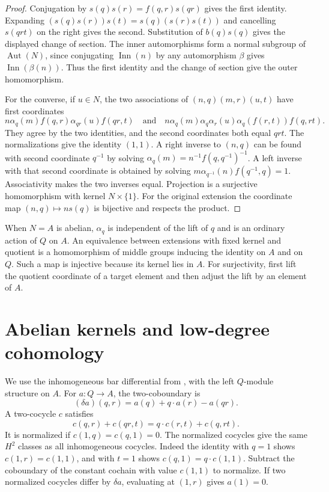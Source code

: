 \documentclass[11pt,oneside,openany]{book}
\theoremstyle{definition}
\theoremstyle{remark}
\begin{document}
\begin{proof}
Conjugation by \(s(q)s(r)=f(q,r)s(qr)\) gives the first identity.
Expanding \((s(q)s(r))s(t)=s(q)(s(r)s(t))\) and cancelling \(s(qrt)\)
on the right gives the second. Substitution of \(b(q)s(q)\) gives
the displayed change of section. The inner automorphisms form a
normal subgroup of \(\operatorname{Aut}(N)\), since conjugating
\(\operatorname{Inn}(n)\) by any automorphism \(\beta\) gives
\(\operatorname{Inn}(\beta(n))\). Thus the first identity and the
change of section give the outer homomorphism.

For the converse, if \(u\in N\), the two associations of
\((n,q)(m,r)(u,t)\) have first coordinates
\[
 n\alpha_q(m) f(q,r)\alpha_{qr}(u) f(qr,t)
 \quad\text{and}\quad
 n\alpha_q(m)\alpha_q\alpha_r(u)\alpha_q(f(r,t))f(q,rt).
\]
They agree by the two identities, and the second coordinates both
equal \(qrt\). The normalizations give the identity \((1,1)\).
A right inverse to \((n,q)\) can be found with second coordinate
\(q^{-1}\) by solving \(\alpha_q(m)=n^{-1}f(q,q^{-1})^{-1}\).
A left inverse with that second coordinate is obtained by solving
\(m\alpha_{q^{-1}}(n)f(q^{-1},q)=1\).
Associativity makes the two inverses equal. Projection is a
surjective homomorphism with kernel \(N\times\{1\}\).
For the original extension the coordinate map
\((n,q)\mapsto ns(q)\) is bijective and respects the product.
\end{proof}

When \(N=A\) is abelian, \(\alpha_q\) is independent of the lift of
\(q\) and is an ordinary action of \(Q\) on \(A\). An equivalence
between extensions with fixed kernel and quotient is a homomorphism
of middle groups inducing the identity on \(A\) and on \(Q\).
Such a map is injective because its kernel lies in \(A\). For
surjectivity, first lift the quotient coordinate of a target
element and then adjust the lift by an element of \(A\).

\section{Abelian kernels and low-degree cohomology}

We use the inhomogeneous bar differential from
\cite[A02 and A03]{homalg}, with the left \(Q\)-module structure on
\(A\). For \(a:Q\to A\), the two-coboundary is
\[
 (\delta a)(q,r)=a(q)+q\cdot a(r)-a(qr).
\]
A two-cocycle \(c\) satisfies
\[
 c(q,r)+c(qr,t)=q\cdot c(r,t)+c(q,rt).
\]
It is normalized if \(c(1,q)=c(q,1)=0\). The normalized
cocycles give the same \(H^2\) classes as all inhomogeneous
cocycles. Indeed the identity with \(q=1\) shows
\(c(1,r)=c(1,1)\), and with \(t=1\) shows \(c(q,1)=q\cdot c(1,1)\).
Subtract the coboundary of the constant cochain with value
\(c(1,1)\) to normalize. If two normalized cocycles differ by
\(\delta a\), evaluating at \((1,r)\) gives \(a(1)=0\).
\end{document}
